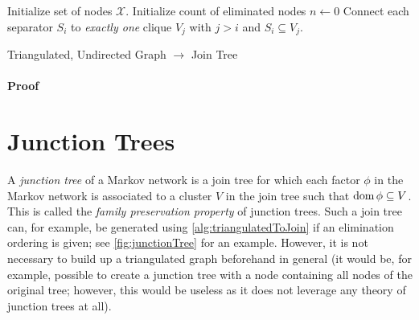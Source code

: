 			\begin{algorithm}  \DontPrintSemicolon
				Initialize set of nodes \(\mathcal{X}\). \;
				Initialize count of eliminated nodes \( n \gets 0 \) \;
				Connect each separator \(S_i\) to \emph{exactly one} clique \(V_j\) with \(j > i\) and \( S_i \subseteq V_j \).
				\caption{Triangulated, Undirected Graph \(\to\) Join Tree}
				\label{alg:triangulatedToJoin}
			\end{algorithm}

			\paragraph{Proof}

	\section{Junction Trees}
		\label{sec:junctionTrees}

		A \emph{junction tree} of a Markov network is a join tree for which each factor \(\phi\) in the Markov network is associated to a cluster \(V\) in the join tree such that \( \operatorname{dom} \phi \subseteq V \). This is called the \emph{family preservation property} of junction trees. Such a join tree can, for example, be generated using \autoref{alg:triangulatedToJoin} if an elimination ordering is given; see \autoref{fig:junctionTree} for an example. However, it is not necessary to build up a triangulated graph beforehand in general (it would be, for example, possible to create a junction tree with a node containing all nodes of the original tree; however, this would be useless as it does not leverage any theory of junction trees at all).

